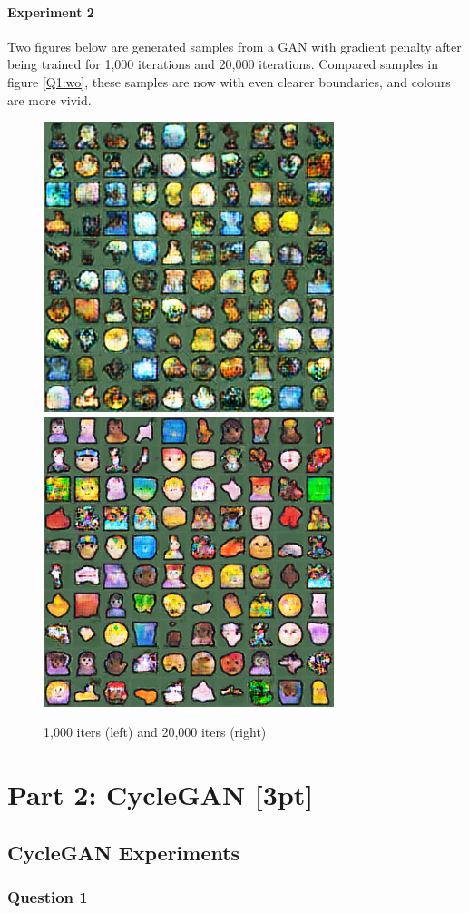 \documentclass{article}
\begin{document}
	\paragraph{Experiment 2} Two figures below are generated samples from a GAN with gradient penalty after being trained for 1,000 iterations and 20,000 iterations. Compared samples in figure \ref{Q1:wo}, these samples are now with even clearer boundaries, and colours are more vivid.
	\begin{figure}[H]
		\centering
		\caption{1,000 iters (left) and 20,000 iters (right)}
		\includegraphics[width=0.45\linewidth]{./samples_dcgan_gp_alpha_alpha/sample-001000.png}
		\includegraphics[width=0.45\linewidth]{./samples_dcgan_gp_alpha_alpha/sample-020000.png}
	\end{figure}
	
	\section{Part 2: CycleGAN [3pt]}
	\subsection{CycleGAN Experiments}
	\subsubsection{Question 1}
\end{document}

